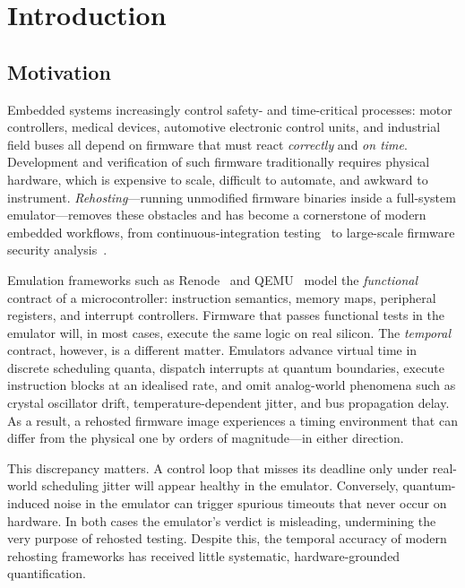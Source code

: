 \chapter{Introduction}
\label{ch:introduction}

\section{Motivation}
\label{sec:intro:motivation}

Embedded systems increasingly control safety- and time-critical
processes: motor controllers, medical devices, automotive electronic
control units, and industrial field buses all depend on firmware that
must react \emph{correctly} and \emph{on time}. Development and
verification of such firmware traditionally requires physical hardware,
which is expensive to scale, difficult to automate, and awkward to
instrument. \emph{Rehosting}---running unmodified firmware binaries
inside a full-system emulator---removes these obstacles and has become
a cornerstone of modern embedded workflows, from continuous-integration
testing~\cite{renode} to large-scale firmware security
analysis~\cite{fasano2021sok,wright2021challenges}.

Emulation frameworks such as Renode~\cite{renode} and
QEMU~\cite{bellard2005qemu} model the \emph{functional} contract of a
microcontroller: instruction semantics, memory maps, peripheral
registers, and interrupt controllers. Firmware that passes functional
tests in the emulator will, in most cases, execute the same logic on
real silicon. The \emph{temporal} contract, however, is a different
matter. Emulators advance virtual time in discrete scheduling quanta,
dispatch interrupts at quantum boundaries, execute instruction blocks at
an idealised rate, and omit analog-world phenomena such as crystal
oscillator drift, temperature-dependent jitter, and bus propagation
delay. As a result, a rehosted firmware image experiences a timing
environment that can differ from the physical one by orders of
magnitude---in either direction.

This discrepancy matters. A control loop that misses its deadline only
under real-world scheduling jitter will appear healthy in the emulator.
Conversely, quantum-induced noise in the emulator can trigger spurious
timeouts that never occur on hardware. In both cases the emulator's
verdict is misleading, undermining the very purpose of rehosted
testing. Despite this, the temporal accuracy of modern rehosting
frameworks has received little systematic, hardware-grounded
quantification.

